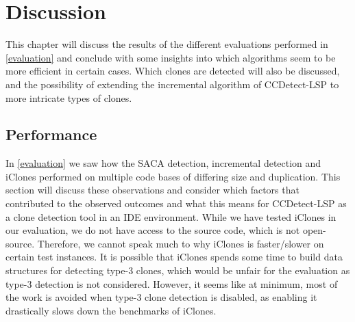 \chapter{Discussion}

This chapter will discuss the results of the different evaluations performed in
\cref{evaluation} and conclude with some insights into which algorithms seem to be more
efficient in certain cases. Which clones are detected will also be discussed, and the
possibility of extending the incremental algorithm of CCDetect-LSP to more intricate types
of clones.

\section{Performance}

In \cref{evaluation} we saw how the SACA detection, incremental detection and iClones
performed on multiple code bases of differing size and duplication. This section will
discuss these observations and consider which factors that contributed to the observed
outcomes and what this means for CCDetect-LSP as a clone detection tool in an IDE
environment. While we have tested iClones in our evaluation, we do not have access to the
source code, which is not open-source. Therefore, we cannot speak much to why iClones is
faster/slower on certain test instances. It is possible that iClones spends some time to
build data structures for detecting type-3 clones, which would be unfair for the
evaluation as type-3 detection is not considered. However, it seems like at minimum, most
of the work is avoided when type-3 clone detection is disabled, as enabling it drastically
slows down the benchmarks of iClones.

